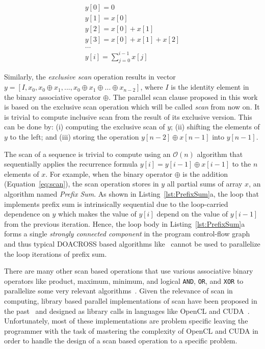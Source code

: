 \documentclass[Ingles]{ic-tese-v1}
\newcommand{\req}[1]{Equation~\ref{eq:#1}}
\newcommand{\rlsts}[2]{Listing~\ref{lst:#1}{#2}}
\begin{document}
\begin{eqnarray}
y[0] = 0\nonumber\\
y[1] = x[0] \nonumber\\
y[2] = x[0] + x[1] \nonumber\\
y[3] = x[0] + x[1] + x[2] \nonumber\\
\dots\nonumber\\
y[i] = \sum_{j=0}^{i-1} x[j]
\label{eq:scan}
\end{eqnarray}

Similarly,  the  {\em  exclusive  scan} operation  results  in  vector
$y =  [ I, x_{0}, x_{0}  \oplus x_{1}, ... ,x_{0}  \oplus x_{1} \oplus
... \oplus x_{n-2}]$, where $I$ is  the identity element in the binary
associative operator  $\oplus$. The  parallel scan clause  proposed in
this work  is based  on the  exclusive scan  operation which  will be
called \textit{scan} from now on.   It is trivial to compute inclusive
scan from  the result of its  exclusive version. This can  be done by:
(i) computing the exclusive scan of $y$; (ii) shifting the elements of
$y$    to    the   left;    and    (iii)    storing   the    operation
$y[n-2] \oplus x[n-1]$ into $y[n-1]$.

The scan of a sequence is trivial to compute using an $\mathcal{O}(n)$
algorithm   that   sequentially   applies   the   recurrence   formula
$y[i]  = y[i-1]  \oplus  x[i-1]$  to the  $n$  elements  of $x$.   For
example,   when  the   binary  operator   $\oplus$  is   the  addition
(\req{scan}), the  scan operation  stores in $y$  all partial  sums of
array  $x$,  an algorithm  named  \textit{Prefix  Sum}.  As  shown  in
\rlsts{PrefixSum}{a}, the  loop   that  implements   prefix  sum   is
intrinsically  sequential due  to the  loop-carried dependence  on $y$
which makes the  value of $y[i]$ depend on the  value of $y[i-1]$ from
the previous  iteration. Hence,  the loop body  in \rlsts{PrefixSum}{a}
forms a  single \textit{strongly  connected component} in  the program
control-flow  graph~\cite{flowgraph} and  thus typical  DOACROSS based
algorithms like~\cite{926166,344315} cannot  be used  to parallelize
the loop iterations of prefix sum.

There are many  other scan based operations that use various
associative  binary  operators  like product,  maximum,  minimum,  and
logical  \texttt{AND}, \texttt{OR},  and  \texttt{XOR} to  parallelize
some                           very                           relevant
algorithms~\cite{NEEDLEMAN1970443,Crow:1984:STT:800031.808600,minimum}.
Given  the relevance  of  scan in  computing,  library based  parallel
implementations    of    scan    have    been    proposed    in    the
past~\cite{dataparallel,  ScanAsPrimitive}  and  designed  as  library
calls   in  languages   like   OpenCL  and   CUDA~\cite{Sengupta:2007,
	Capannini:2011}.   Unfortunately, most  of these  implementations are
problem specific leaving the programmer with the task of mastering the
complexity of OpenCL and CUDA in order  to handle the design of a scan
based operation to a specific problem.
\end{document}
